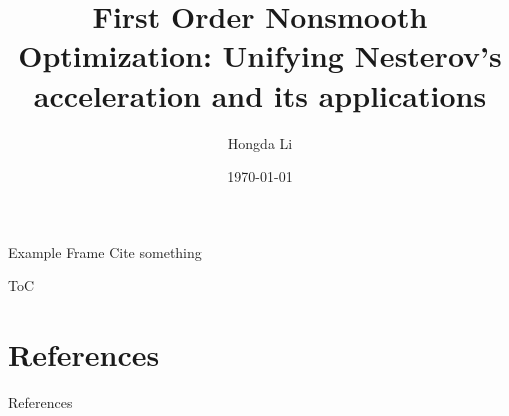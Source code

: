 \documentclass[11pt]{beamer}
\author{Hongda Li}
\title{First Order Nonsmooth Optimization: Unifying Nesterov's acceleration and its applications}
\institute[]{
    University of British Columbia Okanagan
}
\date{\today}
\begin{document}
\begin{frame}
    \titlepage
\end{frame}
\begin{frame}{Example Frame}
    Cite something \cite{nesterov_accelerating_2008} 
    
\end{frame}

\begin{frame}{ToC}
    \tableofcontents
\end{frame}


    
\section{References}
    \begin{frame}[allowframebreaks]{References}
        
        
    \end{frame}
\end{document}

